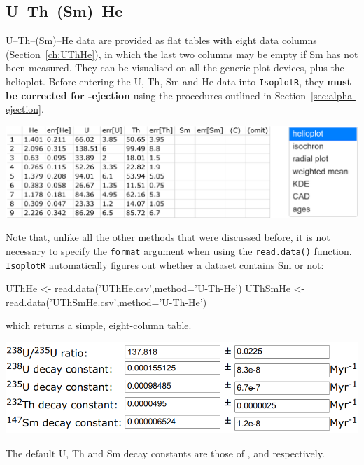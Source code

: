 \begin{refsection}

\chapter{U--Th--(Sm)--He}\label{ch:UThHe-R}

U--Th--(Sm)--He data are provided as flat tables with eight data
columns (Section~\ref{ch:UThHe}), in which the last two columns may be
empty if Sm has not been measured. They can be visualised on all the
generic plot devices, plus the helioplot. Before entering the U, Th,
Sm and He data into \texttt{IsoplotR}, they \textbf{must be corrected
  for \textalpha-ejection} using the procedures outlined in
Section~\ref{sec:alpha-ejection}.

\begin{center}
  \noindent\includegraphics[width=.9\linewidth]{../figures/UThHeInputTablePlotDevices.png}
\end{center}

Note that, unlike all the other methods that were discussed before, it
is not necessary to specify the \texttt{format} argument when using
the \texttt{read.data()} function. \texttt{IsoplotR} automatically
figures out whether a dataset contains Sm or not:

\begin{script}
UThHe <- read.data('UThHe.csv',method='U-Th-He')
UThSmHe <- read.data('UThSmHe.csv',method='U-Th-He')
\end{script}

\noindent which returns a simple, eight-column table.\\

\noindent\begin{minipage}[t]{.65\linewidth}
\strut\vspace*{-\baselineskip}\newline
\includegraphics[width=\linewidth]{../figures/UThSmHeLambda.png}
\end{minipage}
\begin{minipage}[t]{.35\linewidth}
  The default U, Th and Sm decay constants are those of
  \citet{jaffey1971}, \citet{leroux1963} and \citet{villa2020}
  respectively.
\end{minipage}


\end{refsection}
